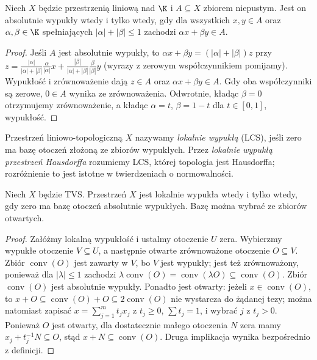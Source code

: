 \begin{stwierdzenie}
\label{prop:absolutna}
Niech $X$ będzie przestrzenią liniową nad $\K$ i
$A\subseteq X$ zbiorem niepustym. Jest on absolutnie wypukły
wtedy i tylko wtedy, gdy dla wszystkich $x,y\in A$ oraz
$\alpha,\beta\in\K$ spełniających $|\alpha|+|\beta|\le1$
zachodzi $\alpha x+\beta y\in A$.
\end{stwierdzenie}
\begin{proof}
Jeśli $A$ jest absolutnie wypukły, to
$\alpha x+\beta y=(|\alpha|+|\beta|)z$ przy
$z=\frac{|\alpha|}{|\alpha|+|\beta|}\frac{\alpha}{|\alpha|}x+
\frac{|\beta|}{|\alpha|+|\beta|}\frac{\beta}{|\beta|}y$
(wyrazy z zerowym współczynnikiem pomijamy).
Wypukłość i zrównoważenie dają $z\in A$ oraz
$\alpha x+\beta y\in A$. Gdy oba współczynniki są zerowe,
$0\in A$ wynika ze zrównoważenia. Odwrotnie, kładąc
$\beta=0$ otrzymujemy zrównoważenie, a kładąc
$\alpha=t$, $\beta=1-t$ dla $t\in[0,1]$, wypukłość.
\end{proof}

\begin{definicja}
\label{def:lcs}
Przestrzeń liniowo-topologiczną $X$ nazywamy
\emph{lokalnie wypukłą} (LCS), jeśli zero ma bazę otoczeń
złożoną ze zbiorów wypukłych. Przez \emph{lokalnie wypukłą
przestrzeń Hausdorffa} rozumiemy LCS, której topologia jest
Hausdorffa; rozróżnienie to jest istotne w twierdzeniach o normowalności.
\end{definicja}

\begin{stwierdzenie}
\label{prop:absconv-base}
Niech $X$ będzie TVS. Przestrzeń $X$ jest lokalnie wypukła
wtedy i tylko wtedy, gdy zero ma bazę otoczeń absolutnie wypukłych.
Bazę można wybrać ze zbiorów otwartych.
\end{stwierdzenie}
\begin{proof}
Załóżmy lokalną wypukłość i ustalmy otoczenie $U$ zera.
Wybierzmy wypukłe otoczenie $V\subseteq U$, a następnie
otwarte zrównoważone otoczenie $O\subseteq V$.
Zbiór $\operatorname{conv}(O)$ jest zawarty w $V$,
bo $V$ jest wypukły; jest też zrównoważony,
ponieważ dla $|\lambda|\le1$ zachodzi
$\lambda\operatorname{conv}(O)=\operatorname{conv}(\lambda O)
\subseteq\operatorname{conv}(O)$.
Zbiór $\operatorname{conv}(O)$ jest absolutnie wypukły.
Ponadto jest otwarty: jeżeli $x\in\operatorname{conv}(O)$,
to $x+O\subseteq\operatorname{conv}(O)+O\subseteq
2\operatorname{conv}(O)$ nie wystarcza do żądanej tezy;
można natomiast zapisać $x=\sum_{j=1}^m t_jx_j$
z $t_j\ge0$, $\sum t_j=1$, i wybrać $j$ z $t_j>0$.
Ponieważ $O$ jest otwarty, dla dostatecznie małego
otoczenia $N$ zera mamy $x_j+t_j^{-1}N\subseteq O$,
stąd $x+N\subseteq\operatorname{conv}(O)$.
Druga implikacja wynika bezpośrednio z definicji.
\end{proof}

